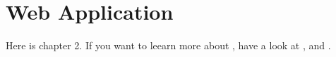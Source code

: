 \chapter{Web Application}\label{ch:ch3label}
Here is chapter 2. If you want to leearn  more about \LaTeXe{}, have a look at \cite{Madsen2010}, \cite{Oetiker2010} and \cite{Mittelbach2005}.
